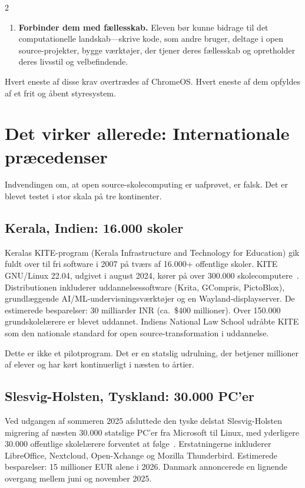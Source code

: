\documentclass[11pt, a4paper]{article}
\begin{document}
\begin{multicols}{2}
\begin{enumerate}
  \item \textbf{Forbinder dem med fællesskab.} Eleven bør kunne bidrage til det computationelle landskab---skrive kode, som andre bruger, deltage i open source-projekter, bygge værktøjer, der tjener deres fællesskab og opretholder deres livsstil og velbefindende.
\end{enumerate}

Hvert eneste af disse krav overtrædes af ChromeOS. Hvert eneste af dem opfyldes af et frit og åbent styresystem.


\section{Det virker allerede: Internationale præcedenser}

Indvendingen om, at open source-skolecomputing er uafprøvet, er falsk. Det er blevet testet i stor skala på tre kontinenter.

\subsection{Kerala, Indien: 16.000 skoler}

Keralas KITE-program (Kerala Infrastructure and Technology for Education) gik fuldt over til fri software i 2007 på tværs af 16.000+ offentlige skoler. KITE GNU/Linux 22.04, udgivet i august 2024, kører på over 300.000 skolecomputere~\citep{kite2024gnulinux}. Distributionen inkluderer uddannelsessoftware (Krita, GCompris, PictoBlox), grundlæggende AI/ML-undervisningsværktøjer og en Wayland-displayserver. De estimerede besparelser: 30 milliarder INR (ca.\ \$400 millioner). Over 150.000 grundskolelærere er blevet uddannet. Indiens National Law School udråbte KITE som den nationale standard for open source-transformation i uddannelse.

Dette er ikke et pilotprogram. Det er en statslig udrulning, der betjener millioner af elever og har kørt kontinuerligt i næsten to årtier.

\subsection{Slesvig-Holsten, Tyskland: 30.000 PC'er}

Ved udgangen af sommeren 2025 afsluttede den tyske delstat Slesvig-Holsten migrering af næsten 30.000 statslige PC'er fra Microsoft til Linux, med yderligere 30.000 offentlige skolelærere forventet at følge~\citep{schleswig2025linux}. Erstatningerne inkluderer LibreOffice, Nextcloud, Open-Xchange og Mozilla Thunderbird. Estimerede besparelser: 15 millioner EUR alene i 2026. Danmark annoncerede en lignende overgang mellem juni og november 2025.


\end{multicols}
\end{document}
